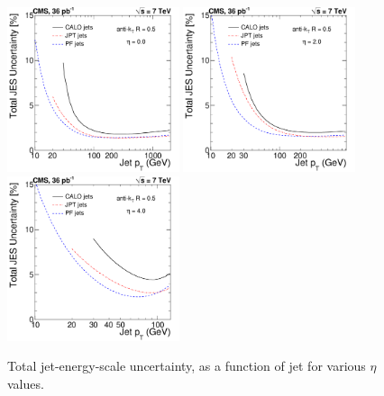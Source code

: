 \begin{figure}[ht!]
  \begin{center}
    \includegraphics[width=0.45\textwidth]{Figures/JEC/Uncertainty_Eta0}
    \includegraphics[width=0.45\textwidth]{Figures/JEC/Uncertainty_Eta20}
    \includegraphics[width=0.45\textwidth]{Figures/JEC/Uncertainty_Eta40}
    \caption{Total jet-energy-scale uncertainty, as a function of jet \pt for various $\eta$ values.}
    \label{fig:finalUncvsPt}
  \end{center}
\end{figure}
